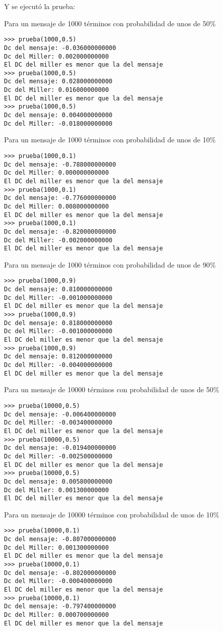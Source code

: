 \documentclass{article}
\begin{document}
Y se ejecutó la prueba:

Para un mensaje de 1000 términos con probabilidad de unos de 50\%
\begin{verbatim}
>>> prueba(1000,0.5)
Dc del mensaje: -0.036000000000
Dc del Miller: 0.002000000000
El DC del miller es menor que la del mensaje
>>> prueba(1000,0.5)
Dc del mensaje: 0.028000000000
Dc del Miller: 0.016000000000
El DC del miller es menor que la del mensaje
>>> prueba(1000,0.5)
Dc del mensaje: 0.004000000000
Dc del Miller: -0.018000000000
\end{verbatim}

Para un mensaje de 1000 términos con probabilidad de unos de 10\%
\begin{verbatim}
>>> prueba(1000,0.1)
Dc del mensaje: -0.788000000000
Dc del Miller: 0.000000000000
El DC del miller es menor que la del mensaje
>>> prueba(1000,0.1)
Dc del mensaje: -0.776000000000
Dc del Miller: 0.008000000000
El DC del miller es menor que la del mensaje
>>> prueba(1000,0.1)
Dc del mensaje: -0.820000000000
Dc del Miller: -0.002000000000
El DC del miller es menor que la del mensaje
\end{verbatim}

Para un mensaje de 1000 términos con probabilidad de unos de 90\%
\begin{verbatim}
>>> prueba(1000,0.9)
Dc del mensaje: 0.810000000000
Dc del Miller: -0.001000000000
El DC del miller es menor que la del mensaje
>>> prueba(1000,0.9)
Dc del mensaje: 0.818000000000
Dc del Miller: -0.001000000000
El DC del miller es menor que la del mensaje
>>> prueba(1000,0.9)
Dc del mensaje: 0.812000000000
Dc del Miller: -0.004000000000
El DC del miller es menor que la del mensaje
\end{verbatim}

Para un mensaje de 10000 términos con probabilidad de unos de 50\%
\begin{verbatim}
>>> prueba(10000,0.5)
Dc del mensaje: -0.006400000000
Dc del Miller: -0.003400000000
El DC del miller es menor que la del mensaje
>>> prueba(10000,0.5)
Dc del mensaje: -0.019400000000
Dc del Miller: -0.002500000000
El DC del miller es menor que la del mensaje
>>> prueba(10000,0.5)
Dc del mensaje: 0.005800000000
Dc del Miller: 0.001300000000
El DC del miller es menor que la del mensaje
\end{verbatim}

Para un mensaje de 10000 términos con probabilidad de unos de 10\%
\begin{verbatim}
>>> prueba(10000,0.1)
Dc del mensaje: -0.807000000000
Dc del Miller: 0.001300000000
El DC del miller es menor que la del mensaje
>>> prueba(10000,0.1)
Dc del mensaje: -0.802000000000
Dc del Miller: -0.000400000000
El DC del miller es menor que la del mensaje
>>> prueba(10000,0.1)
Dc del mensaje: -0.797400000000
Dc del Miller: 0.000700000000
El DC del miller es menor que la del mensaje
\end{verbatim}
\end{document}
